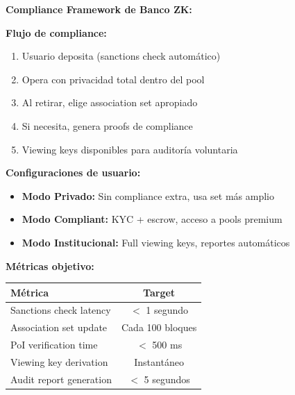 \documentclass[11pt,a4paper,twoside]{book}
\theoremstyle{definition}
\theoremstyle{remark}
\begin{document}
\begin{bancozk}
\textbf{Compliance Framework de Banco ZK:}

\begin{center}
\end{center}

\textbf{Flujo de compliance:}
\begin{enumerate}
    \item Usuario deposita (sanctions check automático)
    \item Opera con privacidad total dentro del pool
    \item Al retirar, elige association set apropiado
    \item Si necesita, genera proofs de compliance
    \item Viewing keys disponibles para auditoría voluntaria
\end{enumerate}

\textbf{Configuraciones de usuario:}
\begin{itemize}
    \item \textbf{Modo Privado:} Sin compliance extra, usa set más amplio
    \item \textbf{Modo Compliant:} KYC + escrow, acceso a pools premium
    \item \textbf{Modo Institucional:} Full viewing keys, reportes automáticos
\end{itemize}

\textbf{Métricas objetivo:}
\begin{center}
\begin{tabular}{lc}
\toprule
\textbf{Métrica} & \textbf{Target} \\
\midrule
Sanctions check latency & $<$ 1 segundo \\
Association set update & Cada 100 bloques \\
PoI verification time & $<$ 500 ms \\
Viewing key derivation & Instantáneo \\
Audit report generation & $<$ 5 segundos \\
\bottomrule
\end{tabular}
\end{center}
\end{bancozk}
\end{document}
